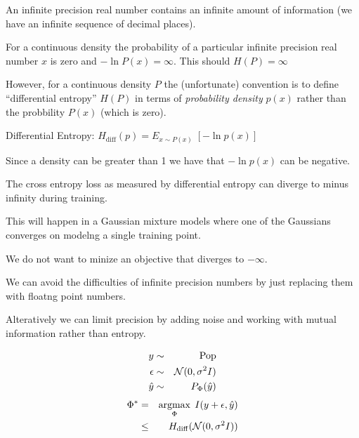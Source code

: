 {

An infinite precision real number contains an infinite amount of information (we have an infinite sequence of decimal places).

\vfill
For a continuous density the probability of a particular infinite precision real number $x$ is zero and $-\ln P(x) = \infty$.  This should $H(P) = \infty$

\vfill
However, for a continuous density $P$ the (unfortunate) convention is to define ``differential entropy'' $H(P)$ in terms of {\em probability density} $p(x)$
rather than the probbility $P(x)$ (which is zero).

\vfill
Differential Entropy: $H_\mathrm{diff}(p) = E_{x \sim P(x)}\;\left[-\ln p(x)\right]$


Since a density can be greater than 1 we have that $- \ln p(x)$ can be negative.

\vfill
The cross entropy loss as measured by differential entropy can diverge to minus infinity during training.

\vfill
This will happen in a Gaussian mixture models where one of the Gaussians converges on modelng a single training point.

\vfill
We do not want to minize an objective that diverges to $-\infty$.


We can avoid the difficulties of infinite precision numbers by just replacing them with floatng point numbers.

\vfill
Alteratively we can limit precision by adding noise and working with mutual information rather than entropy.

\vfill
\begin{eqnarray*}
y & \sim & \mathrm{Pop} \\
\epsilon & \sim & {\cal N}(0,\sigma^2I) \\
\hat{y} &\sim & P_\Phi(\hat{y})
\end{eqnarray*}
\begin{eqnarray*}
\Phi^* & = & \operatorname*{argmax}_\Phi\;I(y+\epsilon,\hat{y}) \\
& \leq & H_{\mathrm{diff}}({\cal N}(0,\sigma^2I))
\end{eqnarray*}

}
